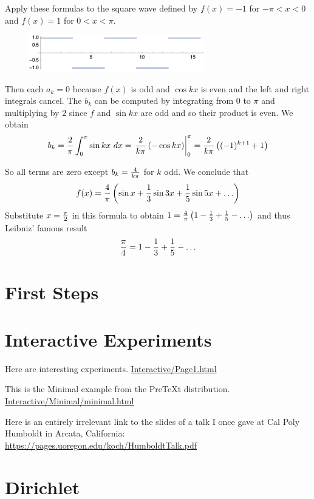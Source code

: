 \documentclass[11pt, oneside]{amsart}
\begin{document}
Apply these formulas to the square wave defined by $f(x) = -1$ for $- \pi < x < 0$ and $f(x) = 1$ for $0 < x < \pi$.

\begin{figure}[H] %
   \centering
   \includegraphics[width=3in]{Graphics/squarewave}
\end{figure}



Then each $a_k = 0$ because $f(x)$ is odd and $\cos kx$ is even and the left and right integrals cancel.
The $b_k$ can be computed by integrating from $0$ to $\pi$ and multiplying by $2$ since $f$ and $\sin kx$ are odd and so their product is even. We obtain
$$b_k = {2 \over \pi} \int_0^\pi  \sin kx \ dx = \left. {2 \over {k \pi}} \left(- \cos kx\right) \right|_0^\pi = {2 \over {k \pi}} \left( (-1)^{k + 1} + 1 \right)$$

So all terms are zero except $b_k = {4 \over {k \pi}}$ for $k$ odd. We conclude that
$$f(x) = {4 \over \pi} \left(\sin x + {1 \over 3} \sin 3x + {1 \over 5} \sin 5x + \ldots\right)$$
Substitute $x = {\pi \over 2}$ in this formula to obtain
$1 = {4 \over \pi} \left(1 - {1 \over 3} + {1 \over 5} - \ldots\right)$ and thus Leibniz' famous result
$${\pi \over 4} = 1 - {1 \over 3} + {1 \over 5} - \ldots$$
 

\ifx\HCode\undefined
\section{First Steps}

\else
\section{Interactive Experiments}
Here are  interesting experiments. \url{Interactive/Page1.html}

This is the Minimal example from the PreTeXt distribution. \url{Interactive/Minimal/minimal.html}
\fi

Here is an entirely irrelevant link to the slides of a talk I once gave at Cal Poly Humboldt in Arcata, California: \url{https://pages.uoregon.edu/koch/HumboldtTalk.pdf}

\section{Dirichlet}
\end{document}
